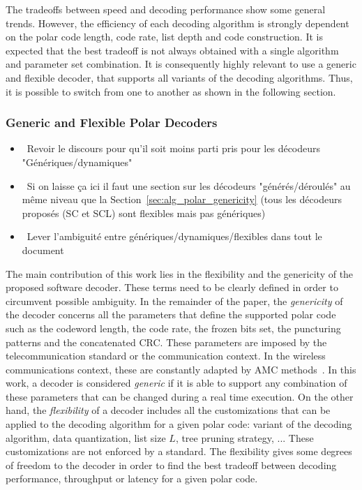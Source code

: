 The tradeoffs between speed and decoding performance show some general trends.
However, the efficiency of each decoding algorithm is strongly dependent on the
polar code length, code rate, list depth and code construction. It is expected
that the best tradeoff is not always obtained with a single algorithm and
parameter set combination. It is consequently highly relevant to use a generic
and flexible decoder, that supports all variants of the decoding algorithms.
Thus, it is possible to switch from one to another as shown in the following
section.

\subsubsection{Generic and Flexible Polar Decoders}
\label{sec:polar_genericity}

\begin{itemize}{}
  \item \xmark~Revoir le discours pour qu'il soit moins parti pris pour les
    décodeurs "Génériques/dynamiques"
  \item \xmark~Si on laisse ça ici il faut une section sur les décodeurs
    "générés/déroulés" au même niveau que la
    Section~\ref{sec:alg_polar_genericity} (tous les décodeurs proposés (SC et
    SCL) sont flexibles mais pas génériques)
  \item \xmark~Lever l'ambiguité entre génériques/dynamiques/flexibles dans tout
    le document
\end{itemize}

The main contribution of this work lies in the flexibility and the genericity of
the proposed software decoder. These terms need to be clearly defined in order
to circumvent possible ambiguity. In the remainder of the paper, the
\textit{genericity} of the decoder concerns all the parameters that define the
supported polar code such as the codeword length, the code rate, the frozen bits
set, the puncturing patterns and the concatenated CRC. These parameters are
imposed by the telecommunication standard or the communication context. In the
wireless communications context, these are constantly adapted by AMC
methods~\cite{Dahlman2013}. In this work, a decoder is considered
\textit{generic} if it is able to support any combination of these parameters
that can be changed during a real time execution. On the other hand, the
\textit{flexibility} of a decoder includes all the customizations that can be
applied to the decoding algorithm for a given polar code: variant of the
decoding algorithm, data quantization, list size $L$, tree pruning strategy, ...
These customizations are not enforced by a standard. The flexibility gives some
degrees of freedom to the decoder in order to find the best tradeoff between
decoding performance, throughput or latency for a given polar code.

